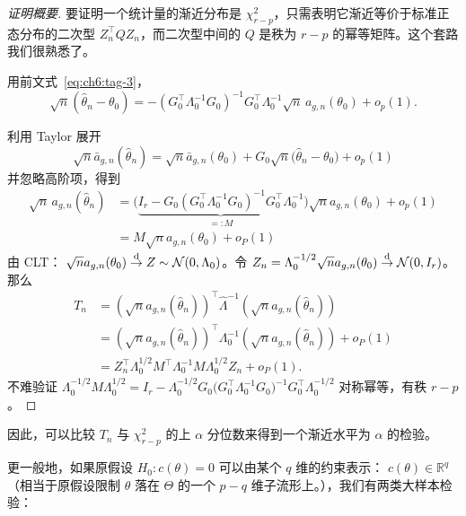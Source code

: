 \begin{proof}[证明概要]
要证明一个统计量的渐近分布是 $\chi^2_{r-p}$，只需表明它渐近等价于标准正态分布的二次型 $Z_n^\top QZ_n$，而二次型中间的 $Q$ 是秩为 $r-p$ 的幂等矩阵。这个套路我们很熟悉了。

用前文式~\eqref{eq:ch6:tag-3}，
\[
\sqrt{n}(\widehat{\theta}_n-\theta_0) = - (G_0^\top \Lambda_0^{-1} G_0)^{-1} G_0^\top \Lambda_0^{-1} \sqrt{n}\,a_{g,n}(\theta_0) + o_p(1).
\]

利用 Taylor 展开 \[ \sqrt{n}\bar a_{g,n}(\widehat\theta_n)=\sqrt{n}\bar a_{g,n}(\theta_0)+G_0\sqrt{n}\big(\widehat\theta_n-\theta_0\big)+o_p(1) \]并忽略高阶项，得到
\[\begin{aligned} \sqrt{n}\, a_{g,n}(\widehat\theta_n)&=\bigl(\underbrace{ I_r -G_0(G_0^\top\Lambda_0^{-1}G_0)^{-1}G_0^\top\Lambda_0^{-1}}_{=:M}\bigr)\sqrt{n} a_{g,n}(\theta_0)+o_p(1)\\ &=M\sqrt na_{g,n}(\theta_0)+o_P(1) \end{aligned}\]
由 CLT： $\sqrt{n} a_{g,n}(\theta_0)\overset{\rm d}\to Z \sim \mathcal{N}(0,\Lambda_0)$。令 $Z_n=\Lambda_0^{-1/2}\sqrt{n} a_{g,n}(\theta_0)\overset{\rm d}\to\mathcal{N}(0,I_r)$。那么\[\begin{aligned}
T_n &= (\sqrt{n} a_{g,n}(\widehat\theta_n))^\top \widehat\Lambda^{-1} (\sqrt{n} a_{g,n}(\widehat\theta_n)) \\
&= (\sqrt{n} a_{g,n}(\widehat\theta_n))^\top \Lambda_0^{-1} (\sqrt{n} a_{g,n}(\widehat\theta_n)) + o_P(1) \\
&=Z_n^\top\Lambda_0^{1/2} M^\top \Lambda_0^{-1} M \Lambda_0^{1/2}Z_n+o_P(1).
\end{aligned}\]不难验证 $\Lambda_0^{-1/2} M \Lambda_0^{1/2}=I_r-\Lambda_0^{-1/2}G_0\bigl(G_0^\top\Lambda_0^{-1}G_0\bigr)^{-1}G_0^\top\Lambda_0^{-1/2}$ 对称幂等，有秩 $r-p$ 。

\end{proof}

因此，可以比较 $T_n$ 与 $\chi^2_{r-p}$ 的上 $\alpha$ 分位数来得到一个渐近水平为 $\alpha$ 的检验。

更一般地，如果原假设 $H_0: c(\theta) = 0$ 可以由某个 $q$ 维的约束表示： $c(\theta)\in \mathbb R^q$ （相当于原假设限制 $\theta$ 落在 $\Theta$ 的一个 $p-q$ 维子流形上。），我们有两类大样本检验：

